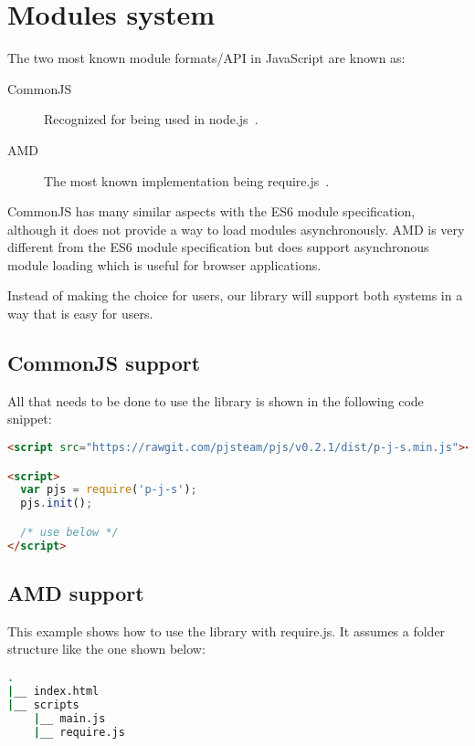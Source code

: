 \section{Modules system}


The two most known module formats/API in JavaScript are known as:
\begin{description}
\item[CommonJS] Recognized for being used in node.js~\cite{nodejs}.
\item[AMD~\cite{amd}] The most known implementation being require.js~\cite{requirejs}.
\end{description}

CommonJS has many similar aspects with the ES6 module specification, although it does not provide a way to load modules asynchronously. AMD is very different from the ES6 module specification but does support asynchronous module loading which is useful for browser applications.

Instead of making the choice for users, our library will support both systems in a way that is easy for users.

\subsection{CommonJS support}
All that needs to be done to use the library is shown in the following code snippet:
\begin{lstlisting}[language=HTML, caption=CommonJS usage]
<script src="https://rawgit.com/pjsteam/pjs/v0.2.1/dist/p-j-s.min.js"></script>

<script>
  var pjs = require('p-j-s');
  pjs.init();

  /* use below */
</script>
\end{lstlisting}

\subsection{AMD support}
This example shows how to use the library with require.js. It assumes a folder structure like the one shown below:
\begin{lstlisting}[language=bash, caption=AMD folder structure]
.
|__ index.html
|__ scripts
    |__ main.js
    |__ require.js
\end{lstlisting}

